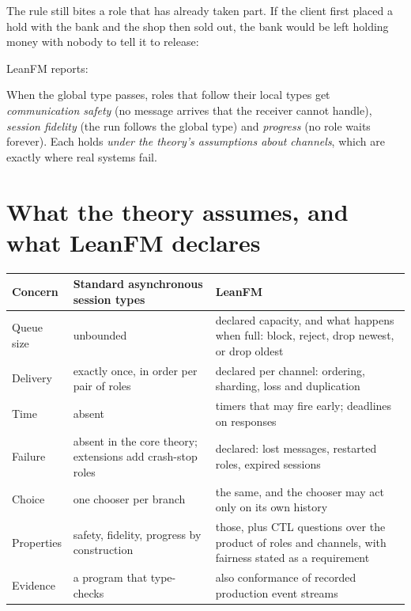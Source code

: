 

The rule still bites a role that has already taken part. If the client first
placed a hold with the bank and the shop then sold out, the bank would be left
holding money with nobody to tell it to release:



LeanFM reports:



When the global type passes, roles that follow their local types get
\emph{communication safety} (no message arrives that the receiver cannot
handle), \emph{session fidelity} (the run follows the global type) and
\emph{progress} (no role waits forever). Each holds \emph{under the theory's
assumptions about channels}, which are exactly where real systems fail.

\section{What the theory assumes, and what LeanFM declares}

\begin{center}
\small
\begin{tabular}{@{}p{}p{}p{}@{}}
\toprule
Concern & Standard asynchronous session types & LeanFM \\
\midrule
Queue size & unbounded & declared capacity, and what happens when full: block, reject, drop newest, or drop oldest \\
Delivery & exactly once, in order per pair of roles & declared per channel: ordering, sharding, loss and duplication \\
Time & absent & timers that may fire early; deadlines on responses \\
Failure & absent in the core theory; extensions add crash-stop roles \citep{barwell2022crash} & declared: lost messages, restarted roles, expired sessions \\
Choice & one chooser per branch & the same, and the chooser may act only on its own history \\
Properties & safety, fidelity, progress by construction & those, plus CTL questions over the product of roles and channels, with fairness stated as a requirement \\
Evidence & a program that type-checks & also conformance of recorded production event streams \\
\bottomrule
\end{tabular}
\end{center}

